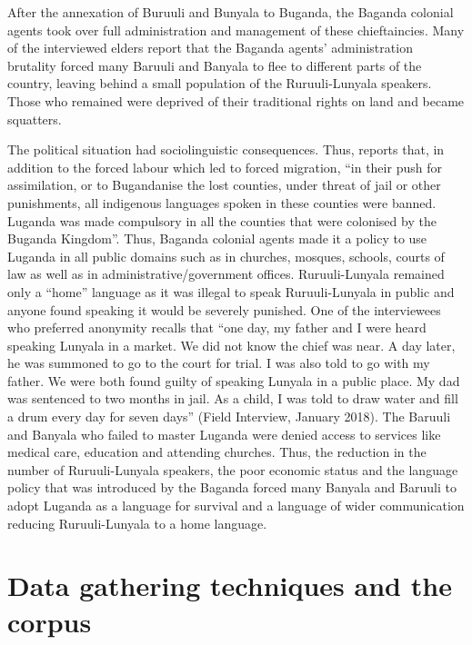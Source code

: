 After the annexation of Buruuli and Bunyala to Buganda, the Baganda colonial agents took over full administration and management of these chieftaincies. 
Many of the interviewed elders report that the Baganda agents’ administration brutality forced many Baruuli and Banyala to flee to different parts of the country, leaving behind a small population of the Ru\-ruu\-li\hyp{}Lu\-nya\-la speakers. Those who remained were deprived of their traditional rights on land and became squatters. 

The political situation had sociolinguistic consequences. 
Thus, \citet[: 42]{Mwogezi2004History} reports that, in addition to the forced labour which led to forced migration, “in their push for assimilation, or to Bugandanise the lost counties, under threat of jail or other punishments, all indigenous languages spoken in these counties were banned. Luganda was made compulsory in all the counties that were colonised by the Buganda Kingdom”. Thus, Baganda colonial agents made it a policy to use Luganda in all public domains such as in churches, mosques, schools, courts of law as well as in administrative/government offices. Ru\-ruu\-li\hyp{}Lu\-nya\-la remained only a “home” language as it was illegal to speak Ru\-ruu\-li\hyp{}Lu\-nya\-la in public and anyone found speaking it would be severely punished. One of the interviewees who preferred anonymity recalls that “one day, my father and I were heard speaking Lunyala in a market. We did not know the chief was near. A day later, he was summoned to go to the court for trial. I was also told to go with my father. We were both found guilty of speaking Lunyala in a public place. My dad was sentenced to two months in jail. As a child, I was told to draw water and fill a drum every day for seven days” (Field Interview, January 2018). The Baruuli and Banyala who failed to master Luganda were denied access to services like medical care, education and attending churches. Thus, the reduction in the number of Ru\-ruu\-li\hyp{}Lu\-nya\-la speakers, the poor economic status and the language policy that was introduced by the Baganda forced many Banyala and Baruuli to adopt Luganda as a language for survival and a language of wider communication reducing Ru\-ruu\-li\hyp{}Lu\-nya\-la to a home language. 


\section{Data gathering techniques and the corpus}\label{sec-Data}

